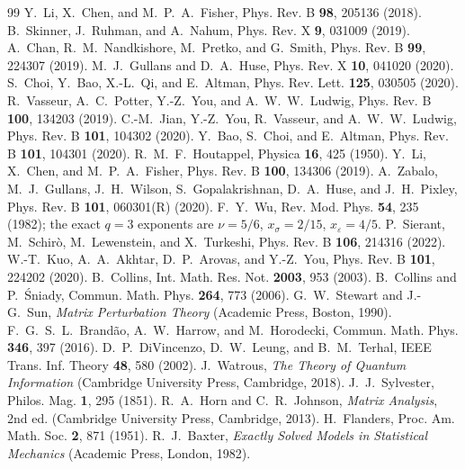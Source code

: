 \documentclass[aps,prx,reprint,superscriptaddress,nobibnotes,longbibliography]{revtex4-2}
\theoremstyle{remark}
\begin{document}
\begin{thebibliography}{99}
 Y.~Li, X.~Chen, and M.~P.~A.~Fisher, Phys. Rev. B \textbf{98}, 205136 (2018).
 B.~Skinner, J.~Ruhman, and A.~Nahum, Phys. Rev. X \textbf{9}, 031009 (2019).
 A.~Chan, R.~M.~Nandkishore, M.~Pretko, and G.~Smith, Phys. Rev. B \textbf{99}, 224307 (2019).
 M.~J.~Gullans and D.~A.~Huse, Phys. Rev. X \textbf{10}, 041020 (2020).
 S.~Choi, Y.~Bao, X.-L.~Qi, and E.~Altman, Phys. Rev. Lett. \textbf{125}, 030505 (2020).
 R.~Vasseur, A.~C.~Potter, Y.-Z.~You, and A.~W.~W.~Ludwig, Phys. Rev. B \textbf{100}, 134203 (2019).
 C.-M.~Jian, Y.-Z.~You, R.~Vasseur, and A.~W.~W.~Ludwig, Phys. Rev. B \textbf{101}, 104302 (2020).
 Y.~Bao, S.~Choi, and E.~Altman, Phys. Rev. B \textbf{101}, 104301 (2020).
 R.~M.~F.~Houtappel, Physica \textbf{16}, 425 (1950).
 Y.~Li, X.~Chen, and M.~P.~A.~Fisher, Phys. Rev. B \textbf{100}, 134306 (2019).
 A.~Zabalo, M.~J.~Gullans, J.~H.~Wilson, S.~Gopalakrishnan, D.~A.~Huse, and J.~H.~Pixley, Phys. Rev. B \textbf{101}, 060301(R) (2020).
 F.~Y.~Wu, Rev. Mod. Phys. \textbf{54}, 235 (1982); the exact $q=3$ exponents are $\nu=5/6$, $x_\sigma=2/15$, $x_\varepsilon=4/5$.
 P.~Sierant, M.~Schir\`o, M.~Lewenstein, and X.~Turkeshi, Phys. Rev. B \textbf{106}, 214316 (2022).
 W.-T.~Kuo, A.~A.~Akhtar, D.~P.~Arovas, and Y.-Z.~You, Phys. Rev. B \textbf{101}, 224202 (2020).
 B.~Collins, Int. Math. Res. Not. \textbf{2003}, 953 (2003).
 B.~Collins and P.~\'Sniady, Commun. Math. Phys. \textbf{264}, 773 (2006).
 G.~W.~Stewart and J.-G.~Sun, \emph{Matrix Perturbation Theory} (Academic Press, Boston, 1990).
 F.~G.~S.~L.~Brand\~ao, A.~W.~Harrow, and M.~Horodecki, Commun. Math. Phys. \textbf{346}, 397 (2016).
 D.~P.~DiVincenzo, D.~W.~Leung, and B.~M.~Terhal, IEEE Trans. Inf. Theory \textbf{48}, 580 (2002).
 J.~Watrous, \emph{The Theory of Quantum Information} (Cambridge University Press, Cambridge, 2018).
 J.~J.~Sylvester, Philos. Mag. \textbf{1}, 295 (1851).
 R.~A.~Horn and C.~R.~Johnson, \emph{Matrix Analysis}, 2nd ed. (Cambridge University Press, Cambridge, 2013).
 H.~Flanders, Proc. Am. Math. Soc. \textbf{2}, 871 (1951).
 R.~J.~Baxter, \emph{Exactly Solved Models in Statistical Mechanics} (Academic Press, London, 1982).

\end{thebibliography}
\end{document}
